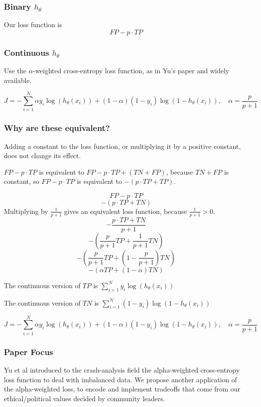 \subsubsection{Binary $h_\theta$}

Our loss function is $$FP - p\cdot TP $$

\subsubsection{Continuous $h_\theta$}

Use the $\alpha$-weighted cross-entropy loss function, as in Yu's paper and widely available.

$$J = -\sum_{i=1}^N \alpha y_i \log( h_\theta (x_i)) + (1-\alpha)(1-y_i) \log( 1 - h_\theta (x_i)), \quad \alpha = \frac{p}{p+1}$$

\subsubsection{Why are these equivalent?}

Adding a constant to the loss function, or multiplying it by a positive constant, does not change its effect.  

$FP - p \cdot TP$ is equivalent to $FP - p \cdot TP + (TN+FP)$, because $TN+FP$ is constant, so 
$FP - p \cdot TP$ is equivalent to $-(p \cdot TP+ TP)$.


$$FP - p \cdot TP$$
$$-(p \cdot TP + TN)$$
Multiplying by $\frac{1}{p+1}$ gives an equivalent loss function, because $\frac{1}{p+1}>0$.
$$-\frac{p \cdot TP + TN}{p+1}$$
$$- \left( \frac{p}{p+1} TP + \frac{1}{p+1} TN\right)$$
$$- \left( \frac{p}{p+1} TP + \left( 1 - \frac{p}{p+1} \right) TN \right)$$
$$- (\alpha TP + (1 - \alpha) TN) $$

The continuous version of $TP$ is 
$ \displaystyle \sum_{i=1}^N y_i \log( h_\theta (x_i))$

The continuous version of $TN$ is 
$ \displaystyle \sum_{i=1}^N (1-y_i) \log( 1 - h_\theta (x_i))$

$$J = -\sum_{i=1}^N \alpha y_i \log( h_\theta (x_i)) + (1-\alpha)(1-y_i) \log( 1 - h_\theta (x_i)), \quad \alpha = \frac{p}{p+1}$$

\subsubsection{Paper Focus}

Yu et al introduced to the crash-analysis field the alpha-weighted cross-entropy loss function to deal with imbalanced data.  We propose another application of the alpha-weighted loss, to encode and implement tradeoffs that come from our ethical/political values decided by community leaders.   

